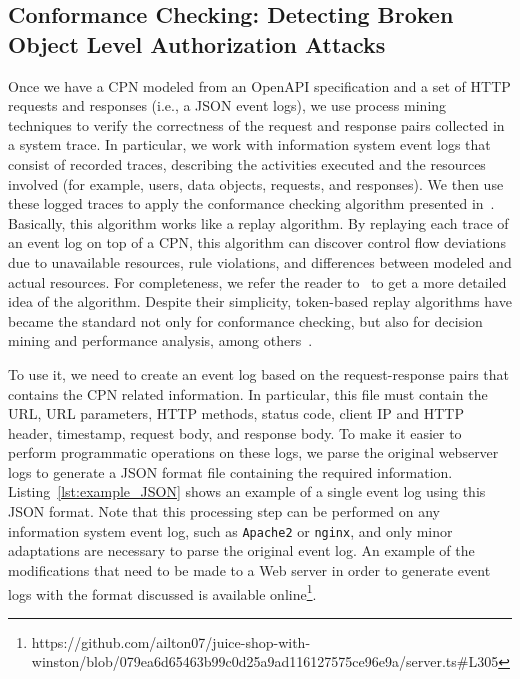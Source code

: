 \subsection{Conformance Checking: Detecting Broken Object Level Authorization Attacks}
\label{sec:detecting_bola}

%

Once we have a CPN modeled from an OpenAPI specification and a set of HTTP requests and responses (i.e., a JSON event logs), we use process mining techniques to verify the correctness of the request and response pairs collected in a system trace. In particular, we work with information system event logs that consist of recorded traces, describing  the  activities executed  and the  resources involved (for example,  users,  data objects, requests, and responses). We then use these logged traces to apply the conformance checking algorithm presented in~\cite{carrasquel2020checking}. Basically, this algorithm works like a replay algorithm. By replaying each trace of an event log on top of a CPN, this algorithm can discover control flow deviations due to unavailable resources, rule violations, and differences between modeled and actual resources. For completeness, we refer the reader to~\cite{carrasquel2020checking} to get a more detailed idea of the algorithm. Despite their simplicity, token-based replay algorithms have became the standard not only for conformance checking, but also for decision mining and performance analysis, among others~\cite{Carmona2018}.

To use it, we need to create an event log based on the request-response pairs that contains the CPN related information. In particular, this file must contain the URL, URL parameters, HTTP methods, status code, client IP and HTTP header, timestamp, request body, and response body. To make it easier to perform programmatic operations on these logs, we parse the original webserver logs to generate a JSON format file containing the required information. Listing~\ref{lst:example_JSON} shows an example of a single event log using this JSON format. Note that this processing step can be performed on any information system event log, such as {\tt Apache2} or {\tt nginx}, and only minor adaptations are necessary to parse the original event log. An example of the modifications that need to be made to a Web server in order to generate event logs with the format discussed is available online\footnote{https://github.com/ailton07/juice-shop-with-winston/blob/079ea6d65463b99c0d25a9ad116127575ce96e9a/server.ts\#L305}.

